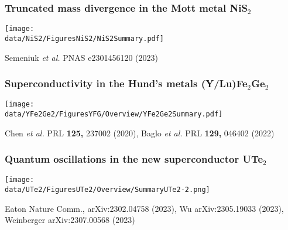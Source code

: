 
\begin{emptyframe}
    \frametitle{Truncated mass divergence in the Mott metal NiS$_2$}
    \centerline{ \texttt{[image: \\data/NiS2/FiguresNiS2/NiS2Summary.pdf]}}
\vspace{-1 em}
\vfill
\centerline{\makebox[\linewidth]{\rule{0.85\textwidth}{0.4pt}}}
\centerline{\scriptsize Semeniuk {\it et al.} PNAS e2301456120 (2023)}
\end{emptyframe}

\begin{emptyframe}
    \frametitle{Superconductivity in the Hund's metals (Y/Lu)Fe$_2$Ge$_2$}
    \centerline{ \texttt{[image: \\data/YFe2Ge2/FiguresYFG/Overview/YFe2Ge2Summary.pdf]}}
\vspace{-1 em}
\vfill 
\centerline{\makebox[\linewidth]{\rule{0.85\textwidth}{0.4pt}}}
\centerline{\scriptsize Chen {\it et al.} PRL {\bf 125,} 237002 (2020), Baglo {\it et al.} PRL {\bf 129,} 046402 (2022)}
\end{emptyframe}

\begin{emptyframe}
    \frametitle{Quantum oscillations in the new superconductor UTe$_2$}
    \centerline{ \texttt{[image: \\data/UTe2/FiguresUTe2/Overview/SummaryUTe2-2.png]}}
\vspace{-1 em}
\vfill 
\centerline{\makebox[\linewidth]{\rule{0.85\textwidth}{0.4pt}}}
\centerline{\scriptsize Eaton Nature Comm., arXiv:2302.04758 (2023), Wu arXiv:2305.19033 (2023), Weinberger arXiv:2307.00568 (2023)}
\end{emptyframe}



